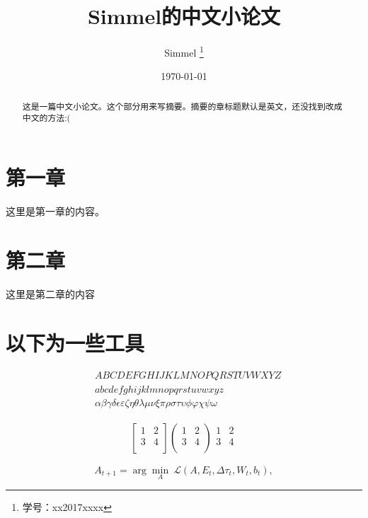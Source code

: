 \documentclass[UTF8,a4paper,10pt,twocolumn]{ctexart}
\title{\textbf{Simmel的中文小论文}}
\author{ Simmel \thanks{学号：xx2017xxxx} }
\date{\today}
\begin{document}
    \maketitle
 
 
\begin{abstract}
这是一篇中文小论文。这个部分用来写摘要。摘要的章标题默认是英文，还没找到改成中文的方法:(
\end{abstract}
 
 
\section*{第一章}
这里是第一章的内容。
 
 
\section{第二章}
这里是第二章的内容
 
 
\section{以下为一些工具}
    \begin{align}
		& ABCDEFGHIJKLMNOPQRSTUVWXYZ \label{eq:alphabet} \\
		& abcdefghijklmnopqrstuvwxyz \\
	& \alpha \beta \gamma \delta \epsilon \varepsilon \zeta \eta \theta \lambda \mu \nu \xi \pi \rho \sigma \tau \upsilon \phi \varphi \chi \psi \omega  
	\end{align}

    \begin{align}
	 \begin{bmatrix}
		1 & 2 \\
		3 & 4 \\
	 \end{bmatrix}
	 \begin{pmatrix}
		1 & 2 \\
		3 & 4 \\
	 \end{pmatrix}
	 \begin{matrix}
		1 & 2 \\
		3 & 4 \\
	 \end{matrix}
	\end{align}
 
    \begin{equation}
	A_{t+1} = \arg\min_A \ \mathcal{L}(A,E_t,\Delta\tau_t,W_t,b_t), \nonumber
	\end{equation}
 
\end{document}
